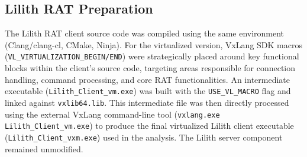 \subsection{Lilith RAT Preparation}
The Lilith RAT client source code \cite{LilithRAT} was compiled using the same environment (Clang/clang-cl, CMake, Ninja). For the virtualized version, VxLang SDK macros (\texttt{VL\_VIRTUALIZATION\_BEGIN/END}) were strategically placed around key functional blocks within the client's source code, targeting areas responsible for connection handling, command processing, and core RAT functionalities. An intermediate executable (\texttt{Lilith\_Client\_vm.exe}) was built with the \texttt{USE\_VL\_MACRO} flag and linked against \texttt{vxlib64.lib}. This intermediate file was then directly processed using the external VxLang command-line tool (\texttt{vxlang.exe Lilith\_Client\_vm.exe}) to produce the final virtualized Lilith client executable (\texttt{Lilith\_Client\_vxm.exe}) used in the analysis. The Lilith server component remained unmodified.

